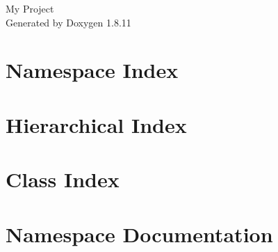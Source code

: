 \documentclass[twoside]{book}
\newcommand{\+}{\discretionary{\mbox{\scriptsize$\hookleftarrow$}}{}{}}
\newcommand{\clearemptydoublepage}{%
  \newpage{\pagestyle{empty}\cleardoublepage}%
}
\begin{document}
\hypersetup{pageanchor=false,
             bookmarksnumbered=true,
             pdfencoding=unicode
            }
\begin{titlepage}
\vspace*{7cm}
\begin{center}%
{\Large My Project }\\
\vspace*{1cm}
{\large Generated by Doxygen 1.8.11}\\
\end{center}
\end{titlepage}
\clearemptydoublepage
\tableofcontents
\clearemptydoublepage
{}
\hypersetup{pageanchor=true}

\chapter{Namespace Index}

\chapter{Hierarchical Index}

\chapter{Class Index}

\chapter{Namespace Documentation}




\end{document}
